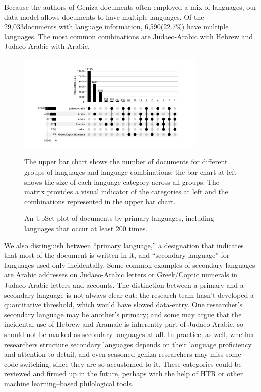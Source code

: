 \documentclass{article}
\def\documentsAnyLang{29,033}
\def\documentsMultiLang{6,590}
\def\percentDocsMultiLang{22.7\%}
\begin{document}
Because the authors of Geniza documents often employed a mix of languages, our data model allows documents to have multiple languages. Of the \documentsAnyLang documents with language information, \documentsMultiLang (\percentDocsMultiLang) have multiple languages. The most common combinations are Judaeo-Arabic with Hebrew and Judaeo-Arabic with Arabic. 

\begin{figure}[!hbt]
  \centering
  \includegraphics[width=0.8\textwidth]{charts/primary_language_upsetplot.pdf}
  \caption{An UpSet plot of documents by primary languages, including languages that occur at least 200 times.}
    \medskip
    \small
    The upper bar chart shows the number of documents for different groups of languages and language combinations; the bar chart at left shows the size of each language category across all groups. The matrix provides a visual indicator of the categories at left and the combinations represented in the upper bar chart.\footnotemark
  \label{fig:lang_combination_upset_plot}
\end{figure}


We also distinguish between “primary language,” a designation that indicates that most of the document is written in it, and “secondary language” for languages used only incidentally. Some common examples of secondary languages are Arabic addresses on Judaeo-Arabic letters or Greek/Coptic numerals in Judaeo-Arabic letters and accounts. The distinction between a primary and a secondary language is not always clear-cut: the research team hasn't developed a quantitative threshold, which would have slowed data-entry. One researcher's secondary language may be another's primary; and some may argue that the incidental use of Hebrew and Aramaic is inherently part of Judaeo-Arabic, so should not be marked as secondary languages at all. In practice, as well, whether researchers structure secondary languages depends on their language proficiency and attention to detail, and even seasoned geniza researchers may miss some code-switching, since they are so accustomed to it. These categories could be reviewed and firmed up in the future, perhaps with the help of HTR or other machine learning–based philological tools.
\end{document}
